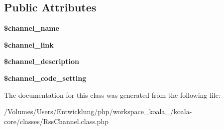 \subsection*{Public Attributes}
\begin{DoxyCompactItemize}
\item 
\hypertarget{class_rss_channel_acedf50fb21163b49c933528ec33489f3}{
{\bfseries \$channel\_\-name}}
\label{class_rss_channel_acedf50fb21163b49c933528ec33489f3}

\item 
\hypertarget{class_rss_channel_a507affec6b37e4bea1c3eaf73e15f1e4}{
{\bfseries \$channel\_\-link}}
\label{class_rss_channel_a507affec6b37e4bea1c3eaf73e15f1e4}

\item 
\hypertarget{class_rss_channel_aef546e530952afc3854811f8a60c1711}{
{\bfseries \$channel\_\-description}}
\label{class_rss_channel_aef546e530952afc3854811f8a60c1711}

\item 
\hypertarget{class_rss_channel_a1cad019bb6f14cae8b64841346325c97}{
{\bfseries \$channel\_\-code\_\-setting}}
\label{class_rss_channel_a1cad019bb6f14cae8b64841346325c97}

\end{DoxyCompactItemize}


The documentation for this class was generated from the following file:\begin{DoxyCompactItemize}
\item 
/Volumes/Users/Entwicklung/php/workspace\_\-koala\_/koala-\/core/classes/RssChannel.class.php\end{DoxyCompactItemize}
